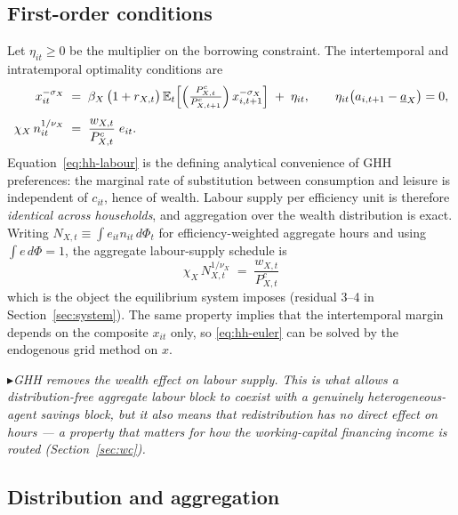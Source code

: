 \documentclass[11pt]{article}
\numberwithin{equation}{section}
\newcommand{\E}{\mathbb{E}}
\theoremstyle{definition}
\theoremstyle{plain}
\theoremstyle{remark}
\newcommand{\impl}[1]{\par\smallskip\noindent\textcolor{notec}{$\blacktriangleright$}\;\emph{#1}\par\smallskip}
\begin{document}
\subsection{First-order conditions}

Let $\eta_{it}\ge0$ be the multiplier on the borrowing constraint. The
intertemporal and intratemporal optimality conditions are
\begin{align}
x_{it}^{-\sigma_X}
&\;=\;\beta_X\,\bigl(1+r_{X,t}\bigr)\,
   \E_t\!\left[\Bigl(\tfrac{P^{c}_{X,t}}{P^{c}_{X,t+1}}\Bigr)\,x_{i,t+1}^{-\sigma_X}\right]
   \;+\;\eta_{it},
\qquad
\eta_{it}\bigl(a_{i,t+1}-\underline{a}_X\bigr)=0,
\label{eq:hh-euler}\\[4pt]
\chi_X\,n_{it}^{1/\nu_X}
&\;=\;\frac{w_{X,t}}{P^{c}_{X,t}}\;e_{it}.
\label{eq:hh-labour}
\end{align}
Equation~\eqref{eq:hh-labour} is the defining analytical convenience of GHH
preferences: the marginal rate of substitution between consumption and leisure is
independent of $c_{it}$, hence of wealth. Labour supply per efficiency unit is
therefore \emph{identical across households}, and aggregation over the wealth
distribution is exact. Writing $N_{X,t}\equiv\int e_{it}n_{it}\,d\Phi_t$ for
efficiency-weighted aggregate hours and using $\int e\,d\Phi=1$, the aggregate
labour-supply schedule is
\begin{equation}
\boxed{\;\chi_X\,N_{X,t}^{1/\nu_X}\;=\;\frac{w_{X,t}}{P^{c}_{X,t}}\;}
\label{eq:agg-labour}
\end{equation}
which is the object the equilibrium system imposes (residual 3--4 in
Section~\ref{sec:system}). The same property implies that the intertemporal margin
depends on the composite $x_{it}$ only, so \eqref{eq:hh-euler} can be solved by the
endogenous grid method on $x$.

\impl{GHH removes the wealth effect on labour supply. This is what allows a
distribution-free aggregate labour block to coexist with a genuinely
heterogeneous-agent savings block, but it also means that redistribution has no
direct effect on hours --- a property that matters for how the working-capital
financing income is routed (Section~\ref{sec:wc}).}

\subsection{Distribution and aggregation}
\end{document}
